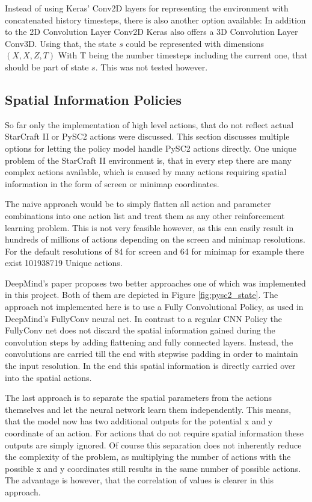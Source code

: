 Instead of using Keras' Conv2D layers for representing the environment with concatenated history timesteps, there is also another option available: In addition to the 2D Convolution Layer Conv2D Keras also offers a 3D Convolution Layer Conv3D. Using that, the state $s$ could be represented with dimensions $(X, X, Z, T)$
With T being the number timesteps including the current one, that should be part of state $s$. This was not tested however.

\subsection{Spatial Information Policies}
\label{sec:spatial}
So far only the implementation of high level actions, that do not reflect actual StarCraft II or PySC2 actions were discussed. This section discusses multiple options for letting the policy model handle PySC2 actions directly. One unique problem of the StarCraft II environment is, that in every step there are many complex actions available, which is caused by many actions requiring spatial information in the form of screen or minimap coordinates.

The naive approach would be to simply flatten all action and parameter combinations into one action list and treat them as any other reinforcement learning problem. This is not very feasible however, as this can easily result in hundreds of millions of actions depending on the screen and minimap resolutions. For the default resolutions of 84 for screen and 64 for minimap for example there exist 101938719 Unique actions.

DeepMind's paper \citep{DBLP:journals/corr/dmsc2} proposes two better approaches one of which was implemented in this project. Both of them are depicted in Figure \ref{fig:pysc2_state}.
The approach not implemented here is to use a Fully Convolutional Policy, as used in DeepMind's FullyConv neural net. In contrast to a regular CNN Policy the FullyConv net does not discard the spatial information gained during the convolution steps by adding flattening and fully connected layers. Instead, the convolutions are carried till the end with stepwise padding in order to maintain the input resolution. In the end this spatial information is directly carried over into the spatial actions.

The last approach is to separate the spatial parameters from the actions themselves and let the neural network learn them independently. This means, that the model now has two additional outputs for the potential x and y coordinate of an action. For actions that do not require spatial information these outputs are simply ignored. Of course this separation does not inherently reduce the complexity of the problem, as multiplying the number of actions with the possible x and y coordinates still results in the same number of possible actions. The advantage is however, that the correlation of values is clearer in this approach. 

